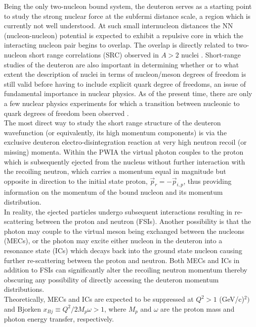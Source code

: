Being the only two-nucleon bound system, the deuteron serves as a starting point to study the strong nuclear force at the subfermi distance scale, a region which is currently
not well understood. At such small internucleon distances the NN (nucleon-nucleon) potential is expected to exhibit a repulsive core in which the interacting
nucleon pair begins to overlap. The overlap is directly related to two-nucleon short range correlations (SRC) observed in $A>2$ nuclei \cite{PhysRevC.68.014313,PhysRevLett.96.082501,PhysRevLett.99.072501,Fomin_2017}.
Short-range studies of the deuteron are also important in determining whether or to what extent the description of nuclei in terms of nucleon/meson degrees of freedom is still valid before
having to include explicit quark degree of freedoms, an issue of fundamental importance in nuclear physics\cite{pr01-020}. As of the present time, there are only a few nuclear physics experiments for
which a transition between nucleonic to quark degrees of freedom been observed \cite{PhysRevLett.81.4576,PhysRevLett.87.102302,PhysRevC.66.042201}.\\
\indent The most direct way to study the short range structure of the deuteron wavefunction (or equivalently, its high momentum components) is via the exclusive deuteron
electro-disintegration reaction at very high neutron recoil (or missing) momenta. Within the PWIA the virtual photon couples to
the proton which is subsequently ejected from the nucleus without further interaction with the recoiling neutron, which carries a momentum equal in magnitude but opposite in direction
to the initial state proton, $\vec{p}_{r} = -\vec{p}_{i,p}$, thus providing information on the momentum of the bound nucleon and its momentum distribution. \\
\indent In reality, the ejected particles undergo subsequent interactions resulting in re-scattering between the proton and neutron (FSIs). Another possibility is that the
photon may couple to the virtual meson being exchanged between the nucleons (MECs), or the photon may excite either nucleon in the deuteron into a resonance state (ICs) which
decays back into the ground state nucleon causing further re-scattering between the proton and neutron. Both MECs and ICs in addition to FSIs can significantly alter the recoiling neutron
momentum thereby obscuring any possibility of directly accessing the deuteron momentum distributions. \\
\indent Theoretically, MECs and ICs are expected to be suppressed at $Q^{2}>1$ (GeV/c)$^{2})$ and Bjorken $x_{Bj}\equiv Q^{2}/2M_{p}\omega>1$, where $M_{p}$ and $\omega$ are the proton mass and photon energy transfer, respectively.
